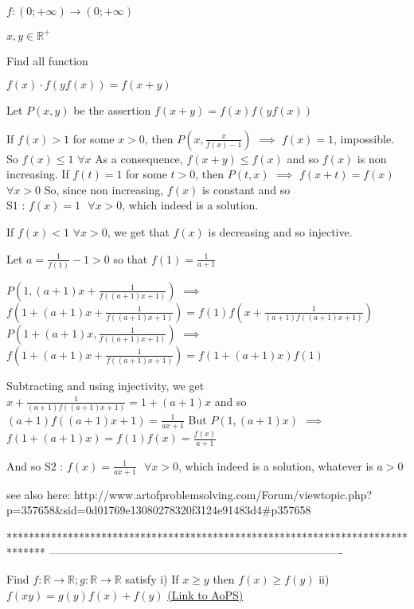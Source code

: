 \begin{solution}
	\begin{tcolorbox}$f: (0; + \infty) \rightarrow (0; + \infty)$

$ x,y\in\mathbb{R}^+ $

Find all function

$f(x) \cdot f(y  f(x))=f(x+y) $\end{tcolorbox}
Let $P(x,y)$ be the assertion $f(x+y)=f(x)f(yf(x))$

If $f(x)>1$ for some $x>0$, then $P(x,\frac x{f(x)-1})$ $\implies$ $f(x)=1$, impossible. So $f(x)\le 1$ $\forall x$
As a consequence, $f(x+y)\le f(x)$ and so $f(x)$ is non increasing.
If $f(t)=1$ for some $t>0$, then $P(t,x)$ $\implies$ $f(x+t)=f(x)$ $\forall x>0$
So, since non increasing, $f(x)$ is constant and so $\boxed{\text{S1 : }f(x)=1\text{  }\forall x>0}$, which indeed is a solution.

If $f(x)<1$ $\forall x>0$, we get that $f(x)$ is decreasing and so injective.

Let $a=\frac 1{f(1)}-1>0$ so that $f(1)=\frac 1{a+1}$

$P(1,(a+1)x+\frac 1{f((a+1)x+1)})$ $\implies$ $f(1+(a+1)x+\frac 1{f((a+1)x+1)})=f(1)f(x+\frac 1{(a+1)f((a+1)x+1)})$
$P(1+(a+1)x,\frac 1{f((a+1)x+1)})$ $\implies$ $f(1+(a+1)x+\frac 1{f((a+1)x+1)})=f(1+(a+1)x)f(1)$

Subtracting and using injectivity, we get $x+\frac 1{(a+1)f((a+1)x+1)}=1+(a+1)x$ and so $(a+1)f((a+1)x+1)=\frac 1{ax+1}$
But $P(1,(a+1)x)$ $\implies$ $f(1+(a+1)x)=f(1)f(x)=\frac{f(x)}{a+1}$

And so $\boxed{\text{S2 : }f(x)=\frac 1{ax+1}\text{  }\forall x>0}$, which indeed is a solution, whatever is $a>0$
\end{solution}



\begin{solution}
	see also here: 
http://www.artofproblemsolving.com/Forum/viewtopic.php?p=357658&sid=0d01769e13080278320f3124e91483d4#p357658
\end{solution}
*******************************************************************************
-------------------------------------------------------------------------------

\begin{problem}
	Find $f: \mathbb{R} \rightarrow  \mathbb{R} ; g: \mathbb{R} \rightarrow  \mathbb{R}$ satisfy
i) If $x \ge y$ then $f(x) \ge f(y)$
ii) $f(xy)=g(y)f(x)+f(y)$
	\flushright \href{https://artofproblemsolving.com/community/c6h616642}{(Link to AoPS)}
\end{problem}



